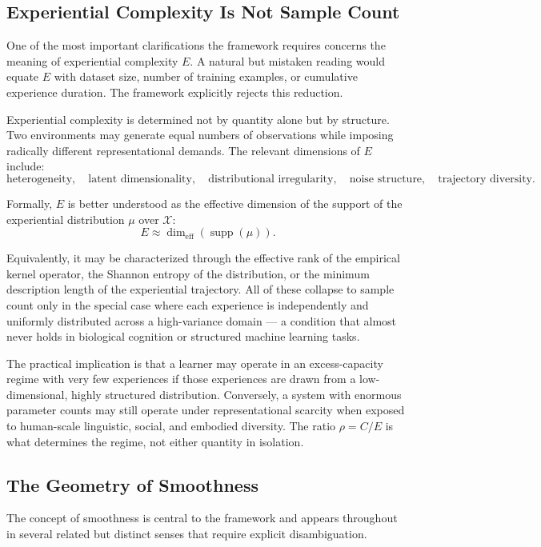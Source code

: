 \documentclass[12pt,a4paper]{article}
\begin{document}
\subsection{Experiential Complexity Is Not Sample Count}

One of the most important clarifications the framework requires concerns the meaning of experiential complexity $E$. A natural but mistaken reading would equate $E$ with dataset size, number of training examples, or cumulative experience duration. The framework explicitly rejects this reduction.

Experiential complexity is determined not by quantity alone but by structure. Two environments may generate equal numbers of observations while imposing radically different representational demands. The relevant dimensions of $E$ include:
\[
\text{heterogeneity},
\quad
\text{latent dimensionality},
\quad
\text{distributional irregularity},
\quad
\text{noise structure},
\quad
\text{trajectory diversity}.
\]

Formally, $E$ is better understood as the effective dimension of the support of the experiential distribution $\mu$ over $\mathcal{X}$:
\[
E \approx \dim_{\text{eff}}(\operatorname{supp}(\mu)).
\]

Equivalently, it may be characterized through the effective rank of the empirical kernel operator, the Shannon entropy of the distribution, or the minimum description length of the experiential trajectory. All of these collapse to sample count only in the special case where each experience is independently and uniformly distributed across a high-variance domain --- a condition that almost never holds in biological cognition or structured machine learning tasks.

The practical implication is that a learner may operate in an excess-capacity regime with very few experiences if those experiences are drawn from a low-dimensional, highly structured distribution. Conversely, a system with enormous parameter counts may still operate under representational scarcity when exposed to human-scale linguistic, social, and embodied diversity. The ratio $\rho = C/E$ is what determines the regime, not either quantity in isolation.

\subsection{The Geometry of Smoothness}

The concept of smoothness is central to the framework and appears throughout in several related but distinct senses that require explicit disambiguation.
\end{document}
